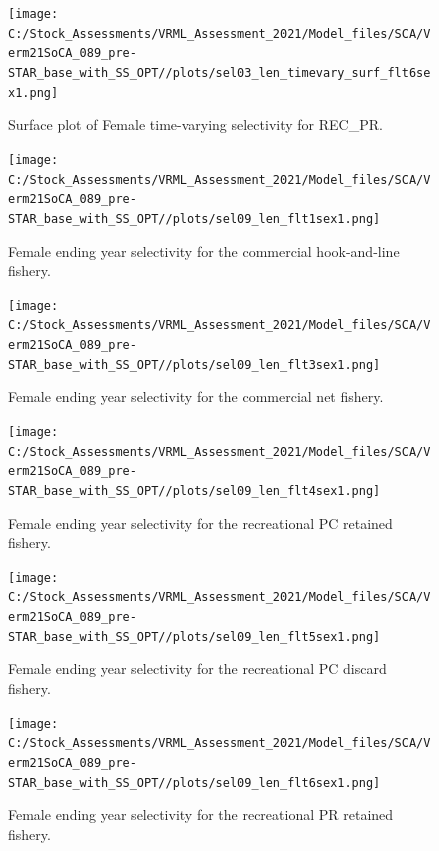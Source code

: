 \documentclass[11pt,
  english,
  a4paper,
]{article}
\begin{document}
\begin{figure}
\centering
\texttt{[image: C:/Stock\_Assessments/VRML\_Assessment\_2021/Model\_files/SCA/Verm21SoCA\_089\_pre-STAR\_base\_with\_SS\_OPT//plots/sel03\_len\_timevary\_surf\_flt6sex1.png]}
\caption{Surface plot of Female time-varying selectivity for REC\_PR.\label{fig:sel03_len_timevary_surf_flt6sex1}}
\end{figure}

\FloatBarrier

\FloatBarrier

\begin{figure}
\centering
\texttt{[image: C:/Stock\_Assessments/VRML\_Assessment\_2021/Model\_files/SCA/Verm21SoCA\_089\_pre-STAR\_base\_with\_SS\_OPT//plots/sel09\_len\_flt1sex1.png]}
\caption{Female ending year selectivity for the commercial hook-and-line fishery.\label{fig:endyr-selex-COM-HKL}}
\end{figure}

\begin{figure}
\centering
\texttt{[image: C:/Stock\_Assessments/VRML\_Assessment\_2021/Model\_files/SCA/Verm21SoCA\_089\_pre-STAR\_base\_with\_SS\_OPT//plots/sel09\_len\_flt3sex1.png]}
\caption{Female ending year selectivity for the commercial net fishery.\label{fig:endyr-selex-COM-NET}}
\end{figure}

\begin{figure}
\centering
\texttt{[image: C:/Stock\_Assessments/VRML\_Assessment\_2021/Model\_files/SCA/Verm21SoCA\_089\_pre-STAR\_base\_with\_SS\_OPT//plots/sel09\_len\_flt4sex1.png]}
\caption{Female ending year selectivity for the recreational PC retained fishery.\label{fig:endyr-selex-REC-PC}}
\end{figure}

\begin{figure}
\centering
\texttt{[image: C:/Stock\_Assessments/VRML\_Assessment\_2021/Model\_files/SCA/Verm21SoCA\_089\_pre-STAR\_base\_with\_SS\_OPT//plots/sel09\_len\_flt5sex1.png]}
\caption{Female ending year selectivity for the recreational PC discard fishery.\label{fig:endyr-selex-REC-PC-DIS}}
\end{figure}

\begin{figure}
\centering
\texttt{[image: C:/Stock\_Assessments/VRML\_Assessment\_2021/Model\_files/SCA/Verm21SoCA\_089\_pre-STAR\_base\_with\_SS\_OPT//plots/sel09\_len\_flt6sex1.png]}
\caption{Female ending year selectivity for the recreational PR retained fishery.\label{fig:endyr-selex-REC-PR}}
\end{figure}
\end{document}
